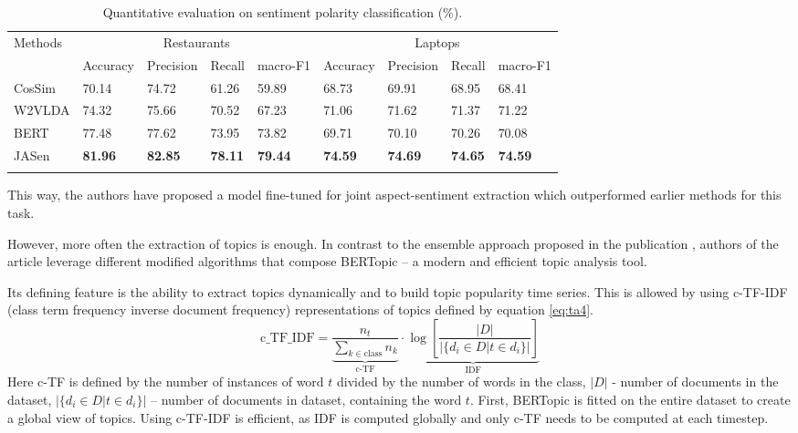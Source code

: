 \documentclass[3p,times,procedia]{elsarticle}
\begin{document}
\begin{table}[h]
\caption{Quantitative evaluation on sentiment polarity classification (\%).}
\label{tab:t2}
\begin{tabular*}{\hsize}{@{\extracolsep{\fill}}lllllllll@{}}
\toprule
\multirow{2}{*}{Methods} & \multicolumn{4}{c}{Restaurants}          & \multicolumn{4}{c}{Laptops}              \\ 
                         & Accuracy & Precision & Recall & macro-F1 & Accuracy & Precision & Recall & macro-F1 \\
\colrule
CosSim & 70.14 & 74.72 & 61.26 & 59.89 & 68.73 & 69.91 & 68.95 & 68.41 \\
W2VLDA & 74.32 & 75.66 & 70.52 & 67.23 & 71.06 & 71.62 & 71.37 & 71.22 \\
BERT & 77.48 & 77.62 & 73.95 & 73.82 & 69.71 & 70.10 & 70.26 & 70.08 \\
JASen & \textbf{81.96} & \textbf{82.85} & \textbf{78.11} & \textbf{79.44} & \textbf{74.59} & \textbf{74.69} & \textbf{74.65} & \textbf{74.59} \\
\botrule
\end{tabular*}
\end{table}

This way, the authors have proposed a model fine-tuned for joint aspect-sentiment extraction which outperformed earlier methods for this task.

However, more often the extraction of topics is enough. In contrast to the ensemble approach proposed in the publication \cite{onan2019two}, authors of the article \cite{grootendorst2022bertopic} leverage different modified algorithms that compose BERTopic -- a modern and efficient topic analysis tool.

Its defining feature is the ability to extract topics dynamically and to build topic popularity time series. This is allowed by using c-TF-IDF (class term frequency inverse document frequency) representations of topics defined by equation \ref{eq:ta4}.
\begin{equation} \label{eq:ta4}
\mathrm{c\_TF\_IDF} = \underbrace{\frac{n_t}{\sum\limits_{k \in \mathrm{class}} n_k}}_{\textrm{c-TF}} \cdot \underbrace{\log \left[ \frac{|D|}{|\{ d_i \in D | t \in d_i \}|} \right]}_{\mathrm{IDF}}
\end{equation}
Here c-TF is defined by the number of instances of word $t$ divided by the number of words in the class, $|D|$ - number of documents in the dataset, $|\{ d_i \in D | t \in d_i \}|$ -- number of documents in dataset, containing the word $t$. First, BERTopic is fitted on the entire dataset to create a global view of topics. Using c-TF-IDF is efficient, as IDF is computed globally and only c-TF needs to be computed at each timestep.
\end{document}
